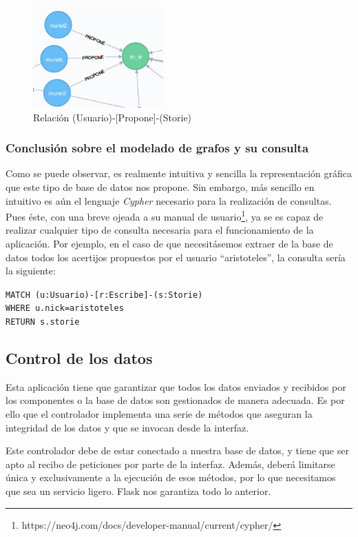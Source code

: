 \begin{figure}[hbtp]
     \centerline{\includegraphics[width=5cm]{figuras/propone.png}}
    \caption{Relación (Usuario)-[Propone]-(Storie)} 
    \label{fig::propone}
\end{figure}

\subsubsection{Conclusión sobre el modelado de grafos y su consulta}

Como se puede observar, es realmente intuitiva y sencilla la representación gráfica que este tipo de base de datos nos propone. Sin embargo, más sencillo  en intuitivo es aún el lenguaje \textit{Cypher} necesario para la realización de consultas. Pues éste, con una breve ojeada a su manual de usuario\footnote{https://neo4j.com/docs/developer-manual/current/cypher/}, ya se es capaz de realizar cualquier tipo de consulta necesaria para el funcionamiento de la aplicación. Por ejemplo, en el caso de que necesitásemos extraer de la base de datos todos los acertijos propuestos por el usuario ``aristoteles'', la consulta sería la siguiente:
\begin{flushleft}
    \texttt{MATCH (u:Usuario)-[r:Escribe]-(s:Storie)\\ WHERE u.nick=aristoteles\\ RETURN s.storie}

\end{flushleft}

\subsection{Control de los datos}

Esta aplicación tiene que garantizar que todos los datos enviados y recibidos por los componentes o la base de datos son gestionados de manera adecuada. Es por ello que el controlador implementa una serie de métodos  que aseguran la integridad de los datos y que se invocan desde la interfaz.

Este controlador debe de estar conectado a nuestra base de datos, y tiene que ser apto al recibo de peticiones por parte de la interfaz. Además, deberá limitarse única y exclusivamente a la ejecución de esos métodos, por lo que necesitamos que sea un servicio ligero. Flask nos garantiza todo lo anterior.

